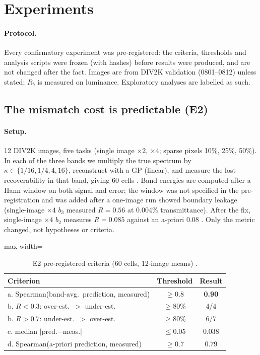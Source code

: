 \section{Experiments}\label{sec:exp}

\paragraph{Protocol.} Every confirmatory experiment was pre-registered: the
criteria, thresholds and analysis scripts were frozen (with hashes) before
results were produced, and are not changed after the fact. Images are from
DIV2K validation (0801--0812) unless stated; $R_b$ is measured on luminance.
Exploratory analyses are labelled as such.

\subsection{The mismatch cost is predictable (E2)}\label{sec:exp-e2}

\paragraph{Setup.} 12 DIV2K images, five tasks (single image $\times2$,
$\times4$; sparse pixels 10\%, 25\%, 50\%). In each of the three bands we
multiply the true spectrum by $\kappa\in\{1/16,1/4,4,16\}$, reconstruct with a
GP (linear), and measure the lost recoverability in that band, giving 60
cells . Band energies are computed after a Hann window on
both signal and error; the window was not specified in the pre-registration
and was added after a one-image run showed boundary leakage (single-image
$\times4$ $b_3$ measured $R=0.56$ at 0.004\% transmittance). After the fix,
single-image $\times4$ $b_2$ measures $R=0.085$ against an a-priori 0.08
. Only the metric changed, not hypotheses or criteria.

\begin{table}[t]\centering\small
\caption{E2 pre-registered criteria (60 cells, 12-image means)
.}\label{tab:e2}
\begin{adjustbox}{max width=\linewidth}\begin{tabular}{lcc}\toprule
Criterion & Threshold & Result\\\midrule
a. Spearman(band-avg.\ prediction, measured) & $\ge0.8$ & \textbf{0.90}\\
b. $R<0.3$: over-est.\ $>$ under-est. & $\ge80\%$ & 4/4\\
b. $R>0.7$: under-est.\ $>$ over-est. & $\ge80\%$ & 6/7\\
c. median $|$pred.$-$meas.$|$ & $\le0.05$ & 0.038\\
d. Spearman(a-priori prediction, measured) & $\ge0.7$ & 0.79\\
\bottomrule\end{tabular}\end{adjustbox}
\end{table}

